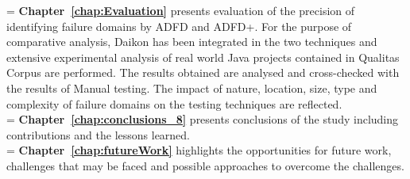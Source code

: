 \hangindent=\parindent
{}
\noindent
\textbf{Chapter~\ref{chap:Evaluation}} presents evaluation of the precision of identifying failure domains by ADFD and ADFD+. For the purpose of comparative analysis, Daikon has been integrated in the two techniques and extensive experimental analysis of real world Java projects contained in Qualitas Corpus are performed. The results obtained are analysed and cross-checked with the results of Manual testing. The impact of nature, location, size, type and complexity of failure domains on the testing techniques are reflected. \\

\hangindent=\parindent
{}
\noindent
\textbf{Chapter~\ref{chap:conclusions_8}} presents conclusions of the study including contributions and the lessons learned.\\

\hangindent=\parindent
{}
\noindent
\textbf{Chapter~\ref{chap:futureWork}} highlights the opportunities for future work, challenges that may be faced and possible approaches to overcome the challenges.



